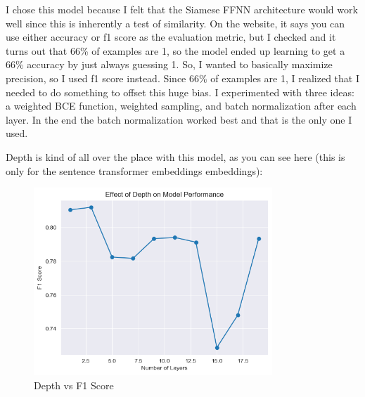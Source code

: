 \documentclass[12pt]{article}
\theoremstyle{definitionstyle}
\begin{document}
\begin{enumerate}
        I chose this model because I felt that the Siamese FFNN architecture would work well since this is inherently a test of similarity. On the website, it says you can use either accuracy or f1 score as the evaluation metric, but I checked and it turns out that 66\% of examples are 1, so the model ended up learning to get a 66\% accuracy by just always guessing 1. So, I wanted to basically maximize precision, so I used f1 score instead. Since 66\% of examples are 1, I realized that I needed to do something to offset this huge bias. I experimented with three ideas: a weighted BCE function, weighted sampling, and batch normalization after each layer. In the end the batch normalization worked best and that is the only one I used. 

        Depth is kind of all over the place with this model, as you can see here (this is only for the sentence transformer embeddings embeddings):
        \begin{figure}[H]
            \centering
            \includegraphics[width=0.8\textwidth]{images/depth_on_siamese.png}
            \caption{Depth vs F1 Score}
        \end{figure}


\end{enumerate}
\end{document}
